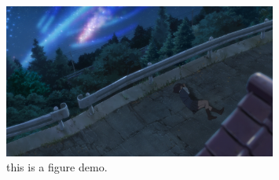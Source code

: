 \documentclass{article}
\begin{document}
\begin{figure}
  \centering
  \includegraphics[width=0.8\textwidth]{image/Your_name.png}  %
  \caption{
    this is a figure demo.
  }  %
  \label{fig:your_name}  %
\end{figure}
\end{document}
